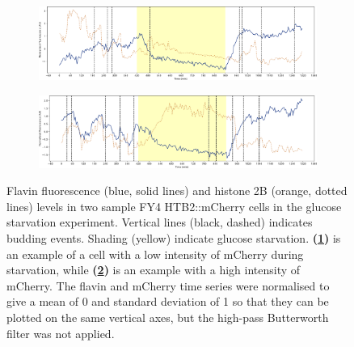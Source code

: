 \begin{figure}[hb!]
  \centering
  \begin{subfigure}[htpb]{1.0\textwidth}
   \centering
   \includegraphics[width=\textwidth]{starvation_raw_13-39-01.pdf}
   \caption{
   }
   \label{fig:biology-starvation-raw-2}
  \end{subfigure}

  \begin{subfigure}[htpb]{1.0\textwidth}
   \centering
   \includegraphics[width=\textwidth]{starvation_raw_13-07-02.pdf}
   \caption{
   }
   \label{fig:biology-starvation-raw-1}
  \end{subfigure}

  \caption[
    Flavin fluorescence and histone 2B levels in two sample FY4 HTB2::mCherry cells in the glucose starvation experiment.
  ]{
    Flavin fluorescence (blue, solid lines) and histone 2B (orange, dotted lines) levels in two sample FY4 HTB2::mCherry cells in the glucose starvation experiment.
    Vertical lines (black, dashed) indicates budding events.
    Shading (yellow) indicate glucose starvation.
    \textbf{(\ref{fig:biology-starvation-raw-2})} is an example of a cell with a low intensity of mCherry during starvation, while \textbf{(\ref{fig:biology-starvation-raw-1})} is an example with a high intensity of mCherry.
    The flavin and mCherry time series were normalised to give a mean of 0 and standard deviation of 1 so that they can be plotted on the same vertical axes, but the high-pass Butterworth filter was not applied.
  }
  \label{fig:biology-starvation-raw}
\end{figure}

